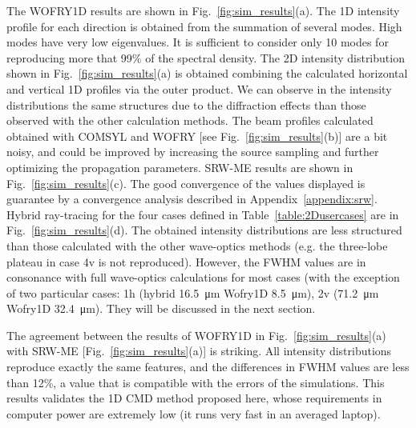 \documentclass{iucr}              %
\begin{document}
\newpage
\twocolumn

The WOFRY1D results are shown in Fig.~\ref{fig:sim_results}(a). The 1D intensity profile for each direction is obtained from the summation of several modes. High modes have very low eigenvalues. It is sufficient to consider only 10 modes for reproducing more that 99\% of the spectral density. The 2D intensity distribution shown in Fig.~\ref{fig:sim_results}(a) is obtained combining the calculated horizontal and vertical 1D profiles via the outer product. 
We can observe in the intensity distributions the same structures due to the diffraction effects than those observed with the other calculation methods.
The beam profiles calculated obtained with COMSYL and WOFRY [see Fig.~\ref{fig:sim_results}(b)] are a bit noisy, and could be improved by increasing the source sampling and further optimizing the propagation parameters. 
SRW-ME results are shown in Fig.~\ref{fig:sim_results}(c). The good convergence of the values displayed is guarantee by a convergence analysis described in Appendix~\ref{appendix:srw}.
Hybrid ray-tracing for the four cases defined in Table~\ref{table:2Dusercases} are in  Fig.~\ref{fig:sim_results}(d). The obtained intensity distributions are less structured than those calculated with the other wave-optics methods (e.g. the three-lobe plateau in case 4v is not reproduced). However, the FWHM values are in consonance with full wave-optics calculations for most cases (with the exception of two particular cases:
1h (hybrid \SI{16.5}{\micro\meter} Wofry1D \SI{8.5}{\micro\meter}),
2v (\SI{71.2}{\micro\meter} Wofry1D \SI{32.4}{\micro\meter}). They will be discussed in the next section.

The agreement between the results of WOFRY1D in Fig.~\ref{fig:sim_results}(a) with SRW-ME [Fig.~\ref{fig:sim_results}(a)] is striking. All intensity distributions reproduce exactly the same features, and the differences in FWHM values are less than 12\%, a value that is compatible with the errors of the simulations. 
This results validates the 1D CMD method proposed here, whose requirements in computer power are extremely low (it runs very fast in an averaged laptop). 
\end{document}
